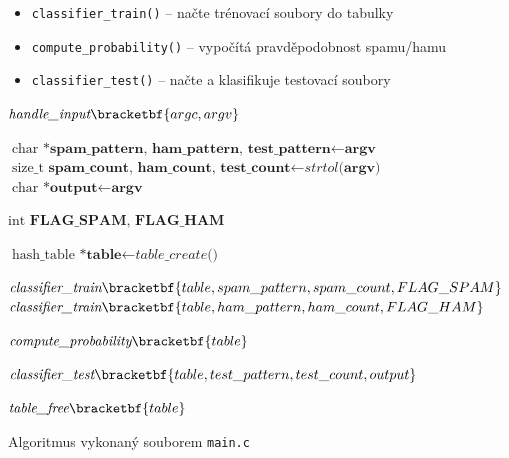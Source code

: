 \documentclass[12pt]{report}
\begin{document}
 	\begin{itemize}
 		\item \texttt{classifier\_train()} – načte trénovací soubory do tabulky
 		\item \texttt{compute\_probability()} – vypočítá pravděpodobnost spamu/hamu
 		\item \texttt{classifier\_test()} – načte a klasifikuje testovací soubory
 	\end{itemize}
 	
 	\begin{algorithm}
 		\begin{algorithmic}[1]
 			
 			\State $\textit{handle\_input} \bracketbf{argc, argv}$
 		
 			\State $\text{char *}\textbf{spam\_pattern, ham\_pattern, test\_pattern} \gets \textbf{argv}$
 			\State $\text{size\_t } \textbf{spam\_count, ham\_count, test\_count} \gets \textit{strtol} \text{(} \textbf{argv} \text{)}$
 			\State $\text{char *}\textbf{output} \gets \textbf{argv}$
 		
 			\State $\text{int }\textbf{FLAG\_SPAM, FLAG\_HAM}$
 		
 			\State $\text{hash\_table *} \textbf{table} \gets \textit{table\_create()}$
 		
 			\State $\textit{classifier\_train}\bracketbf{table, spam\_pattern, spam\_count, FLAG\_SPAM}$
 			\State $\textit{classifier\_train}\bracketbf{table, ham\_pattern, ham\_count, FLAG\_HAM}$
 		
 			\State $\textit{compute\_probability}\bracketbf{table}$
 		
 			\State $\textit{classifier\_test}\bracketbf{table, test\_pattern, test\_count, output}$
 		
 			\State $\textit{table\_free}\bracketbf{table}$
 		
 			\EndProcedure
 		\end{algorithmic} 	
 		\caption{Algoritmus vykonaný souborem \texttt{main.c}}
 		\label{alg:mainAlgo}
 	\end{algorithm}
 
\end{document}
